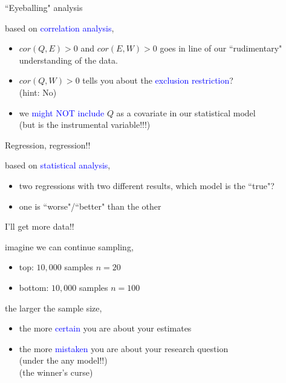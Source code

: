 %
%
\begin{lhframe}[rhgraphic={\texttt{[image: fork5\_panel.pdf]}}]
	{``Eyeballing" analysis}
	
	based on \textcolor{blue}{correlation analysis},
	\begin{itemize}
		\item $cor(Q, E)>0$ and $cor(E, W)>0$ goes in line of our ``rudimentary" understanding of the data.
		\item $cor(Q, W)>0$ tells you about the \textcolor{blue}{exclusion restriction}? \\
		{\small (hint: No)}
		\item we \textcolor{blue}{might NOT include} $Q$ as a covariate in our statistical model \\
		{\small (but is the instrumental variable!!!)}
	\end{itemize}
\end{lhframe}
%
%
\begin{lhframe}[rhgraphic={\texttt{[image: fork5\_reg.png]}}]
	{Regression, regression!!}
	
	based on \textcolor{blue}{statistical analysis},
	\begin{itemize}
		\item two regressions with two different results, which model is the ``true"?
		\item one is ``worse"/``better" than the other
	\end{itemize}
\end{lhframe}
%
%
\begin{lhframe}[rhgraphic={\texttt{[image: fork5\_samplesize.pdf]}}]
	{I'll get more data!!}
	
	imagine we can continue sampling,
	\begin{itemize}
		\item top: $10,000$ samples $n=20$
		\item bottom: $10,000$ samples $n=100$
	\end{itemize}
	
	the larger the sample size,
	\begin{itemize}
		\item the more \textcolor{blue}{certain} you are about your estimates
		\item the more \textcolor{blue}{mistaken} you are about your research question \\
		{\small (under the any model!!)}\\
		{\small \alert{(the winner's curse)}}
	\end{itemize}
\end{lhframe}
